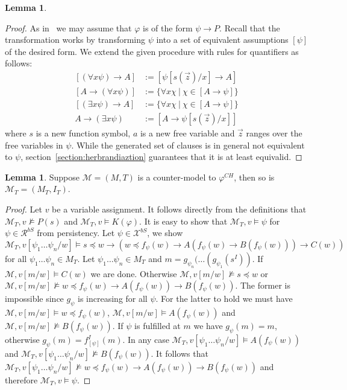 \documentclass{easychair}
\theoremstyle{definition}
\theoremstyle{definition}
\theoremstyle{definition}
\newtheorem{lemma}[theorem]{Lemma}
\theoremstyle{definition}
\theoremstyle{definition}
\theoremstyle{definition}
\theoremstyle{definition}
\begin{document}
\begin{lemma}
\begin{proof}
	As in~\cite{otten2005clausal} we may assume that $\varphi$ is of the form $\psi\to P$. Recall that the transformation works by transforming $\psi$ into a set of equivalent assumptions $\left\lbrack \psi\right\rbrack$ of the desired form. We extend the given procedure with rules for quantifiers as follows:
	\begin{align*}
		\left\lbrack(\forall x \psi)\to A\right\rbrack&:= \left\lbrack\psi[s(\vec z)/x]\to A\right\rbrack\\
		\left\lbrack A\to (\forall x\psi)\right\rbrack&:= \{\forall x\chi\:|\:\chi\in\left\lbrack A\to\psi\right\rbrack\}\\
		\left\lbrack(\exists x\psi)\to A\right\rbrack&:= \{\forall x\chi\:|\:\chi\in\left\lbrack A\to\psi\right\rbrack\}\\
		A\to (\exists x\psi)&:= \left\lbrack A\to\psi[s(\vec z)/x]\right\rbrack
	\end{align*}
	where $s$ is a new function symbol, $a$ is a new free variable and $\vec z$ ranges over the free variables in $\psi$.
	While the generated set of clauses is in general not equivalent to $\psi$, section~\ref{section:herbrandiaztion} guarantees that it is at least equivalid.
\end{proof}

\begin{lemma}\label{proof:prop-simplification}
	Suppose $\mathcal M=(M, T)$ is a counter-model to $\varphi^{CH}$, then so is $\mathcal M_T = (M_T, I_T)$.
\end{lemma}
\begin{proof}
	Let $v$ be a variable assignment. It follows directly from the definitions that $\mathcal M_T, v\not\models P(s)$ and $\mathcal M_T, v\models K(\varphi)$. It is easy to show that $\mathcal M_T, v\models \psi$ for $\psi\in\mathcal R^{bS}$ from persistency. Let $\psi\in\mathcal X^{bS}$, we show $\mathcal M_T, v[\psi_1\dots\psi_n/w] \models s\preceq w\to (w\preceq f_\psi(w)\to A(f_\psi(w)\to B(f_\psi(w)))\to C(w))$ for all $\psi_1\dots\psi_n\in M_T$. Let $\psi_1\dots\psi_n\in M_T$ and $m = g_{\psi_n}(\dots(g_{\psi_1}(s^I))$. If $\mathcal M, v[m/w]\models C(w)$ we are done. Otherwise $\mathcal M, v[m/w]\not\models s\preceq w$ or $\mathcal M, v[m/w]\not\models w\preceq f_\psi(w)\to A(f_\psi(w)) \to B(f_\psi(w))$. The former is impossible since $g_\psi$ is increasing for all $\psi$. For the latter to hold we must have $\mathcal M, v[m/w]\models w\preceq f_\psi(w)$, $\mathcal M, v[m/w]\models A(f_\psi(w))$ and $\mathcal M, v[m/w]\not\models B(f_\psi(w))$. If $\psi$ is fulfilled at $m$ we have $g_\psi(m) = m$, otherwise $g_\psi(m) = f_{[\psi]}^I(m)$. In any case $\mathcal M_T, v[\psi_1\dots\psi_n/w]\models A(f_\psi(w))$ and $\mathcal M_T, v[\psi_1\dots\psi_n/w]\not\models B(f_\psi(w))$. It follows that $\mathcal M_T, v[\psi_1\dots\psi_n/w]\not\models w\preceq f_\psi(w)\to A(f_\psi(w))\to B(f_\psi(w))$ and therefore $\mathcal M_T, v\models \psi$.
\end{proof}




\end{lemma}
\end{document}
